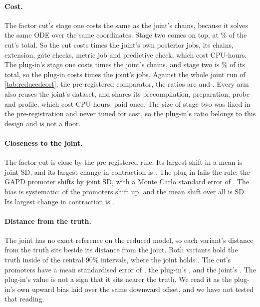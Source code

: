\paragraph{Cost.} The factor cut's stage one costs the same as the joint's chains, because
it solves the same ODE over the same coordinates. Stage two comes on top, at
\% of the cut's total. So the cut costs  times the
joint's own posterior jobs, its chains, extension, gate checks, metric job and predictive
check, which cost  CPU-hours. The plug-in's stage one costs  times the
joint's chains, and stage two is \% of its total, so the plug-in costs
 times the joint's jobs. Against the whole joint run of
\cref{tab:reducedcost}, the pre-registered comparator, the ratios are  and
. Every arm also reuses the joint's dataset, and shares its precompilation, preparation, probe
and profile, which cost  CPU-hours, paid once. The size of stage two was fixed in the
pre-registration and never tuned for cost, so the plug-in's ratio belongs to this design and
is not a floor.

\paragraph{Closeness to the joint.} The factor cut is close by the pre-registered rule. Its
largest shift in a mean is  joint SD, and its largest change in
contraction is . The plug-in fails the rule: the GAPD promoter shifts by
 joint SD, with a Monte Carlo standard error of . The bias is
systematic:  of the  promoters shift up, and the mean
shift over all  is  SD. Its largest change in contraction is
.

\paragraph{Distance from the truth.} The joint has no exact reference on the reduced model,
so each variant's distance from the truth sits beside its distance from the joint. Both
variants hold the truth inside  of the  central 90\%
intervals, where the joint holds . The cut's promoters have a mean
standardised error of , the plug-in's , and the
joint's . The plug-in's value is not a sign that it sits nearer the truth.
We read it as the plug-in's own upward bias laid over the same downward offset, and we have
not tested that reading.

